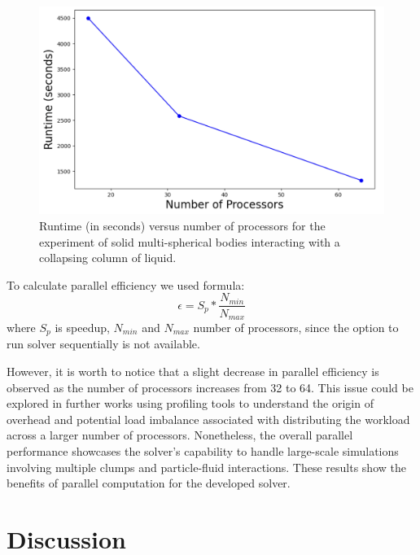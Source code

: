 
\begin{figure}[H]
    \centering
    \includegraphics[width=15cm]{GWU_Thesis_Sarmakeeva/Images/chap3/parallel_runtime.png}
    \caption{Runtime (in seconds) versus number of processors for the experiment of solid multi-spherical bodies interacting with a collapsing column of liquid. }
    \label{fig:runtime}
\end{figure}


To calculate parallel efficiency we used formula:
$$\epsilon = S_p * \frac {N_{min}}{N_{max}}$$
where $S_p$ is speedup, $N_{min}$ and $N_{max}$ number of processors, since the option to run solver sequentially is not available.

However, it is worth to notice that a slight decrease in parallel efficiency is observed as the number of processors increases from 32 to 64. This issue could be explored in further works using profiling tools to understand the origin of overhead and potential load imbalance associated with distributing the workload across a larger number of processors. Nonetheless, the overall parallel performance showcases the solver's capability to handle large-scale simulations involving multiple clumps and particle-fluid interactions. These results show the benefits of parallel computation for the developed solver.

\section{Discussion}

